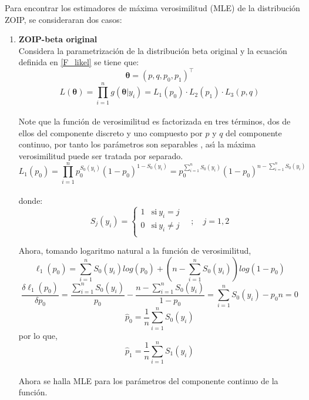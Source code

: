 
Para encontrar los estimadores de m\'{a}xima verosimilitud (MLE) de la distribuci\'{o}n ZOIP, se consideraran dos casos:

\begin{enumerate}
	\item \textbf{ZOIP-beta original}\\
	Considera la parametrizaci\'{o}n de la distribuci\'{o}n beta original y la ecuaci\'{o}n definida en \eqref{F_likel} se tiene que:
	\[
	\boldsymbol{\theta}=(p,q,p_0,p_1)^{\top}
	\]
	\[
	L(\boldsymbol{\theta})=\prod_{i=1}^{n}g(\boldsymbol{\theta}|y_i)=L_1(p_0)\cdot L_2(p_1) \cdot L_3(p,q)
	\]
	\\
Note que la funci\'{o}n de verosimilitud es factorizada en tres t\'{e}rminos, dos de ellos del componente discreto y uno compuesto por $p$ y $q$ del componente continuo, por tanto los par\'{a}metros son separables \citep{Pace1}, as\'{\i} la m\'{a}xima verosimilitud puede ser tratada por separado.\\
\[
L_1(p_0)=\prod_{i=1}^{n}p_0^{S_0(y_i)}(1-p_0)^{1-S_0(y_i)}=p_0^{\sum_{i=1}^{n}{S_0(y_i)}}(1-p_0)^{n-\sum_{i=1}^{n}{S_0(y_i)}}
\]
\\
donde:
\begin{equation}
S_j(y_i)=
\begin{cases}
1 & \text{si}\ y_i=j\\
0 & \text{si}\ y_i\neq j\\
\end{cases}
\quad ; \quad j=1,2 \label{Sj}
\end{equation}

Ahora, tomando logaritmo natural a la funci\'{o}n de verosimilitud,
\[
\ell_1(p_0)=\sum_{i=1}^{n}{S_0(y_i)log(p_0)}+(n-\sum_{i=1}^{n}{S_0(y_i)})log(1-p_0)
\]	
\[
\frac{\delta \ell_1(p_0)}{\delta p_0}=\frac{\sum_{i=1}^{n}{S_0(y_i)}}{p_0}-\frac{n-\sum_{i=1}^{n}{S_0(y_i)}}{1-p_0}=\sum_{i=1}^{n}{S_0(y_i)}-p_0n=0
\]
\[
\hat{p}_0=\frac{1}{n}\sum_{i=1}^{n}{S_0(y_i)}
\]
por lo que, 
\[
\hat{p}_1=\frac{1}{n}\sum_{i=1}^{n}{S_1(y_i)}
\]
\\
Ahora se halla MLE para los par\'{a}metros del componente continuo de la funci\'{o}n.


\end{enumerate}
